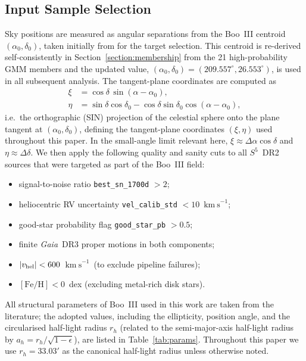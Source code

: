 \documentclass[twocolumn]{aastex631}
\newcommand{\SSSSS}{${S}^5$\xspace}
\newcommand{\gaia}{\textit{Gaia}\xspace}
\newcommand{\vlosUnits}{$\mathrm{km~s}^{-1}$\xspace}
\begin{document}
\subsection{Input Sample Selection} \label{section:input_sample} 
Sky positions are measured as angular separations from the Boo~III centroid $(\alpha_0,\delta_0)$, taken initially from \citet{Grillmair2009} for the target selection.  This centroid is re-derived self-consistently in Section~\ref{section:membership} from the 21 high-probability GMM members and the updated value, $(\alpha_0,\delta_0) = (209.557^\circ, 26.553^\circ)$, is used in all subsequent analysis.  The tangent-plane coordinates are computed as
\begin{align}
\xi  &= \cos\delta\,\sin(\alpha-\alpha_0), \\
\eta &= \sin\delta\cos\delta_0 - \cos\delta\sin\delta_0\cos(\alpha-\alpha_0),
\end{align}
i.e.\ the orthographic (SIN) projection of the celestial sphere onto the plane tangent at $(\alpha_0,\delta_0)$, defining the tangent-plane coordinates $(\xi, \eta)$ used throughout this paper.  In the small-angle limit relevant here, $\xi \approx \Delta\alpha\cos\delta$ and $\eta \approx \Delta\delta$.
We then apply the following quality and sanity cuts to all \SSSSS\ DR2 sources that were targeted as part of the Boo~III field:
\begin{itemize}[itemsep=0pt]
    \item signal-to-noise ratio \texttt{best\_sn\_1700d} $> 2$;
    \item heliocentric RV uncertainty \texttt{vel\_calib\_std} $< 10$~\vlosUnits;
    \item good-star probability flag \texttt{good\_star\_pb} $> 0.5$;
    \item finite \gaia\ DR3 proper motions in both components;
    \item $|v_{\rm hel}| < 600$~\vlosUnits\ (to exclude pipeline failures);
    \item $[\mathrm{Fe/H}] < 0$~dex (excluding metal-rich disk stars).
\end{itemize}
All structural parameters of Boo~III used in this work are taken from the literature; the adopted values, including the ellipticity, position angle, and the circularised half-light radius $r_h$ (related to the semi-major-axis half-light radius by $a_h = r_h / \sqrt{1-\epsilon}$), are listed in Table~\ref{tab:params}. Throughout this paper we use $r_h = 33.03'$ \citep{Moskowitz2020} as the canonical half-light radius unless otherwise noted.
\end{document}
